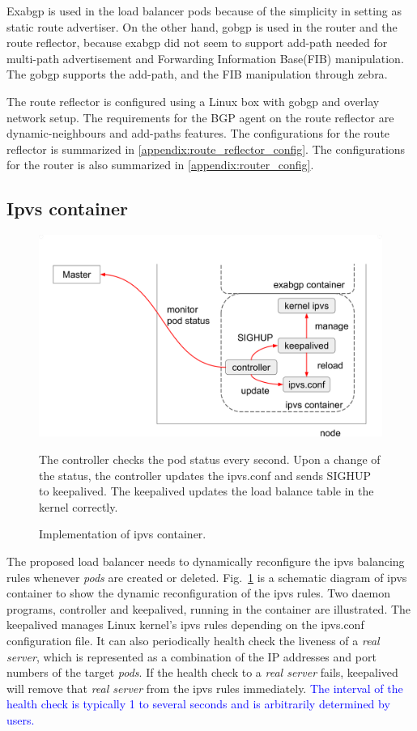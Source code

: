 Exabgp is used in the load balancer pods because of the simplicity in setting as static route advertiser.
On the other hand, gobgp is used in the router and the route reflector, because exabgp did not seem to support add-path\cite{rfc7911} needed for multi-path advertisement and Forwarding Information Base(FIB) manipulation\cite{exa-networks_2018}.
The gobgp supports the add-path, and the FIB manipulation through zebra\cite{osrg_gobgp_zebra}.

The route reflector is configured using a Linux box with gobgp and overlay network setup.
The requirements for the BGP agent on the route reflector are dynamic-neighbours and add-paths features.
The configurations for the route reflector is summarized in \ref{appendix:route_reflector_config}.
The configurations for the router is also summarized in \ref{appendix:router_config}.

\subsection{Ipvs container}

\begin{figure}[tb]
\includegraphics[width=\columnwidth]{Figs/ipvs-ingress-schem}
\caption{Implementation of ipvs container.}
The controller checks the pod status every second.
Upon a change of the status, the controller updates the ipvs.conf and sends SIGHUP to keepalived.
The keepalived updates the load balance table in the kernel correctly.
\label{fig:ipvs-ingress-schem}
\end{figure} 

The proposed load balancer needs to dynamically reconfigure the ipvs balancing rules whenever {\em pods} are created or deleted. 
Fig.~\ref{fig:ipvs-ingress-schem} is a schematic diagram of ipvs container to show the dynamic reconfiguration of the ipvs rules.
Two daemon programs, controller and keepalived, running in the container are illustrated.
The keepalived manages Linux kernel's ipvs rules depending on the ipvs.conf configuration file.
It can also periodically health check the liveness of a {\em real server}, 
which is represented as a combination of the IP addresses and port numbers of the target {\em pods}. 
If the health check to a {\em real server} fails, keepalived will remove that {\em real server} from the ipvs rules immediately.
\textcolor{blue}{
The interval of the health check is typically 1 to several seconds and is arbitrarily determined by users.  
}

